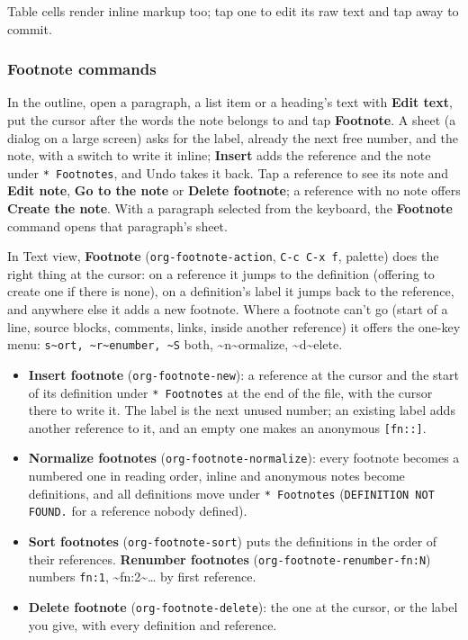 \documentclass[11pt]{article}
\begin{document}
Table cells render inline markup too; tap one to edit its raw text and tap away to commit.

\subsubsection{Footnote commands}
\label{sec:org83b9f5a}
In the outline, open a paragraph, a list item or a heading's text with \textbf{Edit text}, put the cursor after the words the note belongs to and tap \textbf{Footnote}. A sheet (a dialog on a large screen) asks for the label, already the next free number, and the note, with a switch to write it inline; \textbf{Insert} adds the reference and the note under \texttt{* Footnotes}, and Undo takes it back. Tap a reference to see its note and \textbf{Edit note}, \textbf{Go to the note} or \textbf{Delete footnote}; a reference with no note offers \textbf{Create the note}. With a paragraph selected from the keyboard, the \textbf{Footnote} command opens that paragraph's sheet.

In Text view, \textbf{Footnote} (\texttt{org-footnote-action}, \texttt{C-c C-x f}, palette) does the right thing at the cursor: on a reference it jumps to the definition (offering to create one if there is none), on a definition's label it jumps back to the reference, and anywhere else it adds a new footnote. Where a footnote can't go (start of a line, source blocks, comments, links, inside another reference) it offers the one-key menu: \texttt{s\textasciitilde{}ort, \textasciitilde{}r\textasciitilde{}enumber, \textasciitilde{}S} both, \textasciitilde{}n\textasciitilde{}ormalize, \textasciitilde{}d\textasciitilde{}elete.

\begin{itemize}
\item \textbf{Insert footnote} (\texttt{org-footnote-new}): a reference at the cursor and the start of its definition under \texttt{* Footnotes} at the end of the file, with the cursor there to write it. The label is the next unused number; an existing label adds another reference to it, and an empty one makes an anonymous \texttt{[fn::]}.
\item \textbf{Normalize footnotes} (\texttt{org-footnote-normalize}): every footnote becomes a numbered one in reading order, inline and anonymous notes become definitions, and all definitions move under \texttt{* Footnotes} (\texttt{DEFINITION NOT FOUND.} for a reference nobody defined).
\item \textbf{Sort footnotes} (\texttt{org-footnote-sort}) puts the definitions in the order of their references. \textbf{Renumber footnotes} (\texttt{org-footnote-renumber-fn:N}) numbers \texttt{fn:1}, \textasciitilde{}fn:2\textasciitilde{}… by first reference.
\item \textbf{Delete footnote} (\texttt{org-footnote-delete}): the one at the cursor, or the label you give, with every definition and reference.
\end{itemize}
\end{document}
